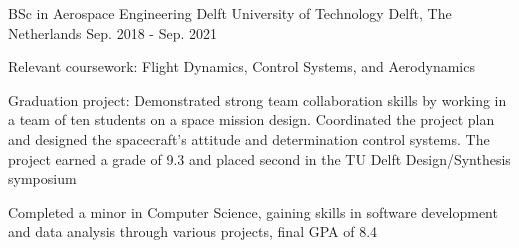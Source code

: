   \cventry
    {BSc in Aerospace Engineering} %
    {Delft University of Technology} %
    {Delft, The Netherlands} %
    {Sep. 2018 - Sep. 2021} %
    {
      \begin{cvitems} %
        \item {Relevant coursework: Flight Dynamics, Control Systems, and Aerodynamics}
        \item {Graduation project: Demonstrated strong team collaboration skills by working in a team of ten students on a space mission design. Coordinated the project plan and designed the spacecraft's attitude and determination control systems. The project earned a grade of 9.3 and placed second in the TU Delft Design/Synthesis symposium}
        \item {Completed a minor in Computer Science, gaining skills in software development and data analysis through various projects, final GPA of 8.4}
      \end{cvitems}
    }

